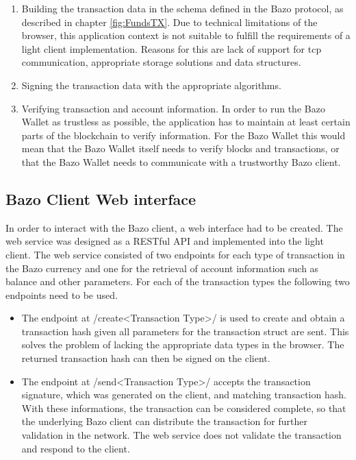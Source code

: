 \begin{enumerate}
\item Building the transaction data in the schema defined in the Bazo protocol, as described in chapter \ref{fig:FundsTX}.
Due to technical limitations of the browser, this application context is not suitable to fulfill the requirements of a light client implementation. Reasons for this are lack of support for tcp communication, appropriate storage solutions and data structures.

\item Signing the transaction data with the appropriate algorithms.
\item Verifying transaction and account information.
In order to run the Bazo Wallet as trustless as possible, the application has to maintain at least certain parts of the blockchain to verify information. For the Bazo Wallet this would mean that the Bazo Wallet itself needs to verify blocks and transactions, or that the Bazo Wallet needs to communicate with a trustworthy Bazo client.
\end{enumerate}

\subsection{Bazo Client Web interface} \label{bazoclientwebinterface}
In order to interact with the Bazo client, a web interface had to be created. The web service was designed as a RESTful API and implemented into the light client.
The web service consisted of two endpoints for each type of transaction in the Bazo currency and one for the retrieval of account information such as balance and other parameters.
For each of the transaction types the following two endpoints need to be used.
\begin{itemize}
\item The endpoint at /create<Transaction Type>/ is used to create and obtain a transaction hash given all parameters for the transaction struct are sent. This solves the problem of lacking the appropriate data types in the browser. The  returned transaction hash can then be signed on the client.
\item The endpoint at /send<Transaction Type>/ accepts the transaction signature, which was generated on the client, and matching transaction hash. With these informations, the transaction can be considered complete, so that the underlying Bazo client can distribute the transaction for further validation in the network. The web service does not validate the transaction and respond to the client.
\end{itemize}

